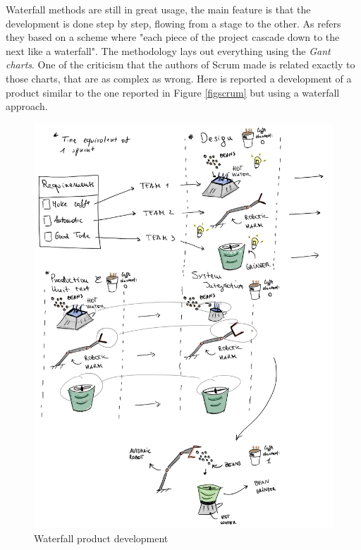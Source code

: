 \documentclass[../main.tex]{subfiles}
\begin{document}
Waterfall methods are still in great usage, the main feature is that the development is done step by step, flowing from a stage to the other. As \cite{Scrum} refers they based on a scheme where "each piece of the project cascade down to the next like a waterfall". The methodology lays out everything using the \textit{Gant charts}. One of the criticism that the authors of Scrum made is related exactly to those charts, that are as complex as wrong. Here is reported a development of a product similar to the one reported in Figure \ref{figscrum} but using a waterfall approach.\\
\begin{figure}[H]
    \centering
    \includegraphics[width=\linewidth]{images_folder/waterfall.png}
    \caption{Waterfall product development}
    \label{fig:swaterrddev}
\end{figure}
\end{document}
